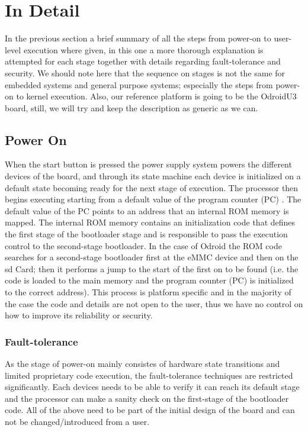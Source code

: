\section{In Detail}

In the previous section a brief summary of all the steps from power-on to user-level execution where given, in this one a more thorough explanation is attempted for each stage together with details regarding fault-tolerance and security. We should note here that the sequence on stages is not the same for embedded systems and general purpose systems; especially the steps from power-on to kernel execution. Also, our reference platform is going to be the OdroidU3 board, still, we will try and keep the description as generic as we can. 


\subsection{Power On}

When the start button is pressed the power supply system powers the different devices of the board, and through its state machine each device is initialized on a default state becoming ready for the next stage of execution. The processor then begins executing starting from a default value of the program counter (PC) \cite{Fundamentals_of_Booting_for_Embedded_Processors}. The default value of the PC points to an address that an internal ROM memory is mapped. The internal ROM memory contains an initialization code that defines the first stage of the bootloader stage and is responsible to pass the execution control to the second-stage bootloader. In the case of Odroid the ROM code searches for a second-stage bootloader first at the eMMC device and then on the sd Card; then it performs a jump to the start of the first on to be found (i.e. the code is loaded to the main memory and the program counter (PC) is initialized to the correct address). This process is platform specific and in the majority of the case the code and details are not open to the user, thus we have no control on how to improve its reliability or security.

\subsubsection{Fault-tolerance}

As the stage of power-on mainly consistes of hardware state transitions and limited proprietary code execution, the fault-tolerance techniques are restricted significantly. Each devices needs to be able to verify it can reach its default stage and the processor can make a sanity check on the first-stage of the bootloader code. All of the above need to be part of the initial design of the board and can not be changed/introduced from a user.

